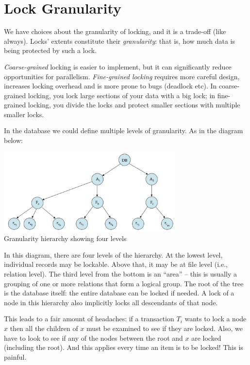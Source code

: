 \section*{Lock Granularity}

We have choices about the granularity of locking, and it is a trade-off (like always). Locks' extents constitute their {\it granularity}: that is, how much data is being protected by such a lock.

\textit{Coarse-grained} locking is easier to implement, but it can significantly reduce opportunities for parallelism. \textit{Fine-grained locking} requires more careful design, increases locking overhead and is more prone to bugs (deadlock etc).  
In coarse-grained locking, you lock large sections of your data with a big lock; in fine-grained locking, you divide the locks and protect smaller sections with multiple smaller locks.

In the database we could define multiple levels of granularity. As in the diagram below:

\begin{center}
\includegraphics[width=0.7\textwidth]{images/granularity-hierarchy}\\
Granularity hierarchy showing four levels~\cite{dsc}
\end{center}

In this diagram, there are four levels of the hierarchy. At the lowest level, individual records may be lockable. Above that, it may be at file level (i.e., relation level). The third level from the bottom is an ``area'' -- this is usually a grouping of one or more relations that form a logical group. The root of the tree is the database itself: the entire database can be locked if needed. A lock of a node in this hierarchy also implicitly locks all descendants of that node.

This leads to a fair amount of headaches: if a transaction $T_{i}$ wants to lock a node $x$ then all the children of $x$ must be examined to see if they are locked. Also, we have to look to see if any of the nodes between the root and $x$ are locked (including the root). And this applies every time an item is to be locked! This is painful. 

